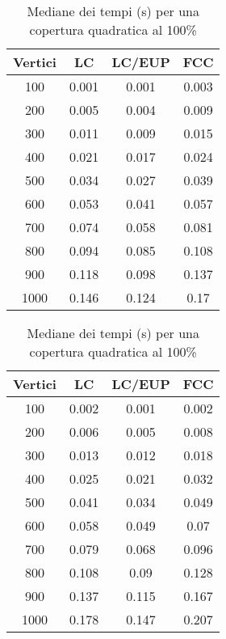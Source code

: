 \begin{table}[!h]
    \parbox{.48\linewidth}{
        \begin{tabular}{|c|c|c|c|}
            \hline
            Vertici & LC    & LC/EUP & FCC   \\ \hline
            100     & 0.001 & 0.001  & 0.003 \\ \hline
            200     & 0.005 & 0.004  & 0.009 \\ \hline
            300     & 0.011 & 0.009  & 0.015 \\ \hline
            400     & 0.021 & 0.017  & 0.024 \\ \hline
            500     & 0.034 & 0.027  & 0.039 \\ \hline
            600     & 0.053 & 0.041  & 0.057 \\ \hline
            700     & 0.074 & 0.058  & 0.081 \\ \hline
            800     & 0.094 & 0.085  & 0.108 \\ \hline
            900     & 0.118 & 0.098  & 0.137 \\ \hline
            1000    & 0.146 & 0.124  & 0.17  \\ \hline
        \end{tabular}
        \centering
        \captionsetup{justification=centering}
        \caption{Mediane dei tempi (s) per una copertura quadratica al 75\%}
    }
    \hfill
    \parbox{.48\linewidth}{
        \centering
        \captionsetup{justification=centering}
        \begin{tabular}{|c|c|c|c|}
            \hline
            Vertici & LC    & LC/EUP & FCC   \\ \hline
            100     & 0.002 & 0.001  & 0.002 \\ \hline
            200     & 0.006 & 0.005  & 0.008 \\ \hline
            300     & 0.013 & 0.012  & 0.018 \\ \hline
            400     & 0.025 & 0.021  & 0.032 \\ \hline
            500     & 0.041 & 0.034  & 0.049 \\ \hline
            600     & 0.058 & 0.049  & 0.07  \\ \hline
            700     & 0.079 & 0.068  & 0.096 \\ \hline
            800     & 0.108 & 0.09   & 0.128 \\ \hline
            900     & 0.137 & 0.115  & 0.167 \\ \hline
            1000    & 0.178 & 0.147  & 0.207 \\ \hline
        \end{tabular}
        \caption{Mediane dei tempi (s) per una copertura quadratica al 100\%}
    }
\end{table}

